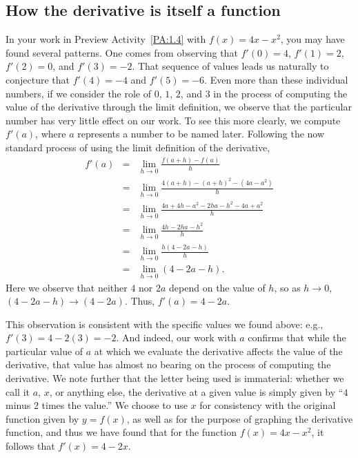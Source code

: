 \subsection*{How the derivative is itself a function}

In your work in Preview Activity~\ref{PA:1.4} with $f(x) = 4x - x^2$, you may have found several patterns.  One comes from observing that $f'(0) = 4$, $f'(1) = 2$, $f'(2) = 0$, and $f'(3) = -2$.  That sequence of values leads us naturally to conjecture that $f'(4) = -4$ and $f'(5) = -6.$  Even more than these individual numbers, if we consider the role of $0$, $1$, $2$, and $3$ in the process of computing the value of the derivative through the limit definition, we observe that the particular number has very little effect on our work.  To see this more clearly, we compute $f'(a)$, where $a$ represents a number to be named later.  Following the now standard process of using the limit definition of the derivative, 
\begin{eqnarray*}
f'(a) & = & \lim_{h \to 0} \frac{f(a + h) - f(a)}{h} \\
& = & \lim_{h \to 0} \frac{4(a + h) - (a + h)^2 - (4a-a^2)}{h} \\
& = & \lim_{h \to 0} \frac{4a + 4h - a^2 - 2ha - h^2 - 4a+a^2}{h} \\
& = & \lim_{h \to 0} \frac{4h - 2ha - h^2}{h} \\
& = & \lim_{h \to 0} \frac{h(4 - 2a - h)}{h} \\
& = & \lim_{h \to 0} (4 - 2a - h).
\end{eqnarray*}
Here we observe that neither $4$ nor $2a$ depend on the value of $h$, so as $h \to 0$, $(4 - 2a - h) \to (4 - 2a)$.  Thus, $f'(a) = 4 - 2a$.

This observation is consistent with the specific values we found above:  e.g., $f'(3) = 4 - 2(3) = -2$.  And indeed, our work with $a$ confirms that while the particular value of $a$ at which we evaluate the derivative affects the value of the derivative, that value has almost no bearing on the process of computing the derivative.   We note further that the letter being used is immaterial:  whether we call it $a$, $x$, or anything else, the derivative at a given value is simply given by ``$4$ minus $2$ times the value.''  We choose to use $x$ for consistency with the original function given by $y = f(x)$, as well as for the purpose of graphing the derivative function, and thus we have found that for the function $f(x) = 4x - x^2$, it follows that $f'(x) = 4 - 2x.$

